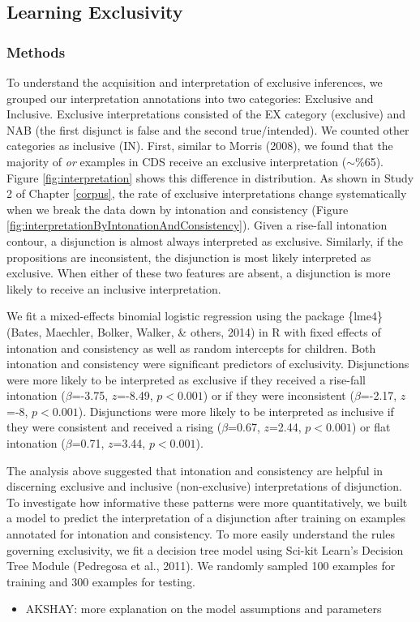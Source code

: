 \documentclass[oneside]{report}
\theoremstyle{definition}
\theoremstyle{definition}
\theoremstyle{definition}
\theoremstyle{remark}
\begin{document}
\subsection{Learning Exclusivity}\label{learning-exclusivity}

\subsubsection{Methods}\label{methods-4}

To understand the acquisition and interpretation of exclusive
inferences, we grouped our interpretation annotations into two
categories: Exclusive and Inclusive. Exclusive interpretations consisted
of the EX category (exclusive) and NAB (the first disjunct is false and
the second true/intended). We counted other categories as inclusive
(IN). First, similar to Morris (2008), we found that the majority of
\emph{or} examples in CDS receive an exclusive interpretation
(\(\sim\)\%65). Figure \ref{fig:interpretation} shows this difference in
distribution. As shown in Study 2 of Chapter \ref{corpus}, the rate of
exclusive interpretations change systematically when we break the data
down by intonation and consistency (Figure
\ref{fig:interpretationByIntonationAndConsistency}). Given a rise-fall
intonation contour, a disjunction is almost always interpreted as
exclusive. Similarly, if the propositions are inconsistent, the
disjunction is most likely interpreted as exclusive. When either of
these two features are absent, a disjunction is more likely to receive
an inclusive interpretation.

We fit a mixed-effects binomial logistic regression using the package
\{lme4\} (Bates, Maechler, Bolker, Walker, \& others, 2014) in R with
fixed effects of intonation and consistency as well as random intercepts
for children. Both intonation and consistency were significant
predictors of exclusivity. Disjunctions were more likely to be
interpreted as exclusive if they received a rise-fall intonation
(\(\beta\)=-3.75, \(z\)=-8.49, \(p < 0.001\)) or if they were
inconsistent (\(\beta\)=-2.17, \(z\)=-8, \(p < 0.001\)). Disjunctions
were more likely to be interpreted as inclusive if they were consistent
and received a rising (\(\beta\)=0.67, \(z\)=2.44, \(p < 0.001\)) or
flat intonation (\(\beta\)=0.71, \(z\)=3.44, \(p < 0.001\)).

The analysis above suggested that intonation and consistency are helpful
in discerning exclusive and inclusive (non-exclusive) interpretations of
disjunction. To investigate how informative these patterns were more
quantitatively, we built a model to predict the interpretation of a
disjunction after training on examples annotated for intonation and
consistency. To more easily understand the rules governing exclusivity,
we fit a decision tree model using Sci-kit Learn's Decision Tree Module
(Pedregosa et al., 2011). We randomly sampled 100 examples for training
and 300 examples for testing.
\begin{itemize}
\tightlist
\item
  AKSHAY: more explanation on the model assumptions and parameters
\end{itemize}
\end{document}
